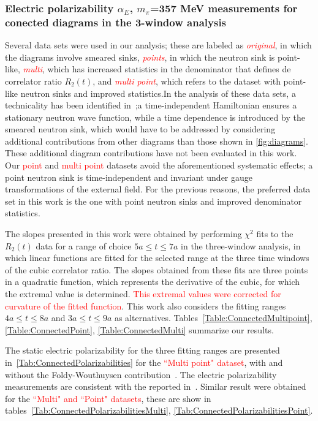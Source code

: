 \subsubsection{Electric polarizability $\alpha_E$, $m_{\pi}$=357 MeV measurements for
conected diagrams in the 3-window analysis}
\label{357}
Several data sets were used in our analysis; these are labeled as \textcolor{red}{\textit{original}},
in which the diagrams involve smeared sinks, \textcolor{red}{\textit{points}}, in which
the neutron sink is point-like,  \textcolor{red}{\textit{multi}}, which has increased statistics
in the denominator that defines de correlator ratio $R_2(t)$, and  
\textcolor{red}{\textit{multi point}}, which refers to the dataset with point-like neutron
sinks and improved statistics.In the analysis of these data sets, a technicality 
has been identified in~\cite{engelhardt1};a time-independent Hamiltonian ensures 
a stationary neutron wave function, while a time dependence is introduced by 
the smeared neutron sink, which would have to be addressed by considering 
additional contributions from other diagrams than those shown in \ref{fig:diagrams}. 
These additional diagram contributions have not been evaluated in this work. 
Our \textcolor{red}{point} and \textcolor{red}{multi point} datasets avoid the 
aforementioned systematic effects; a point neutron sink is time-independent 
and invariant under gauge transformations of the external field. For the previous reasons,
the preferred data set in this work is the one with point neutron sinks 
and improved denominator statistics.

The slopes presented in this work were obtained by performing $\chi^2$ 
fits to the $R_2(t)$ data for a range of choice $5a\le t\le7a$ in the three-window analysis,
in which linear functions are fitted for the selected range at the three time windows
of the cubic correlator ratio. The slopes obtained from these fits are three points in
a quadratic function, which represents the derivative of the cubic, for which the
extremal value is determined. \textcolor{red}{This extremal values were corrected for curvature of the
fitted function}. This work also considers the fitting ranges $4a\le t\le 8a$ and $3a\le t\le 9a$ 
as alternatives. Tables~\ref{Table:ConnectedMultipoint}, \ref{Table:ConnectedPoint},
 \ref{Table:ConnectedMulti} summarize our results.
 
 The static electric polarizability for the three fitting ranges are presented 
 in~\ref{Tab:ConnectedPolarizabilities} for the \textcolor{red} {``Multi point" dataset}, 
 with and without the Foldy-Wouthuysen contribution~\cite{foldywouthuysen}. 
 The electric polarizability measurements are consistent with the reported in~\cite{engelhardt2}. 
 Similar result were obtained for the \textcolor{red}{``Multi" and ``Point" datasets}, these are
 show in tables~\ref{Tab:ConnectedPolarizabilitiesMulti}, \ref{Tab:ConnectedPolarizabilitiesPoint}.
 
